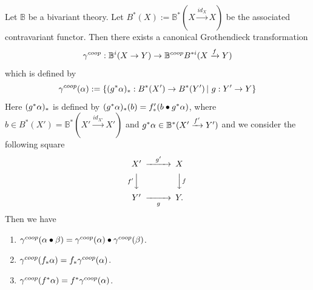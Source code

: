 \documentclass[a4paper]{amsart}
\begin{document}
\begin{pro} Let $\mathbb B$ be a bivariant theory. Let $B^*(X):=\mathbb B^*(X \xrightarrow {id_X} X)$ be the associated contravariant functor. Then there exists a canonical Grothendieck transformation
$$\gamma^{coop}: \mathbb B^i(X \to Y) \to \mathbb B^{coop}B^{* i}(X \xrightarrow f Y )$$ 
which is defined by
$$\gamma^{coop} (\alpha) := \left \{ (g^*\alpha)_*:B^*(X') \to B^*(Y') \, | \, \, g:Y' \to Y \right \}$$
Here $(g^*\alpha)_*$ is defined by $(g^*\alpha)_*(b)= f'_*(b \bullet g^*\alpha)$, where $b \in B^*(X')=\mathbb B^*(X' \xrightarrow {id_{X'}} X')$ and $g^*\alpha \in \mathbb B^*(X' \xrightarrow {f'} Y')$ and we consider the following square
$$\CD
X' @> {g'}  >> X\\
@V {f'} VV @VV fV\\
Y' @>> {g} > Y.\\
\endCD
$$
Then we have
\begin{enumerate}
\item $\gamma^{coop} (\alpha \bullet \beta)= \gamma^{coop}(\alpha) \bullet \gamma^{coop}(\beta)$.
\item $\gamma^{coop} (f_*\alpha)= f_*\gamma^{coop}(\alpha)$.
\item $\gamma^{coop} (f^*\alpha)= f^*\gamma^{coop}(\alpha)$.
\end{enumerate}
\end{pro}
\end{document}
